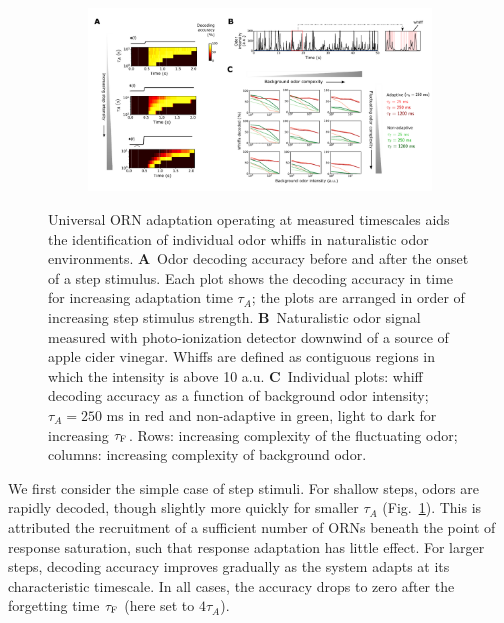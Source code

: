 \documentclass[9pt,twocolumn,twoside,lineno]{pnas-new}
\begin{document}
\begin{figure}[!tb]
	\begin{subfigure}[t]{\linewidth}
		{\includegraphics[width=\linewidth]{figures/4_temporal_coding}}
		\label{fig:temporal_coding_a}
	\end{subfigure}
	\begin{subfigure}[t]{0\linewidth}
		\label{fig:temporal_coding_b}
	\end{subfigure}
	\begin{subfigure}[t]{0\linewidth}
		\label{fig:temporal_coding_c}
	\end{subfigure}
	\caption{\footnotesize{Universal ORN adaptation operating at measured timescales aids the identification of individual odor whiffs in naturalistic odor environments.
			\textbf{A}~Odor decoding accuracy before and after the onset of a step stimulus. Each plot shows the decoding accuracy in time for increasing adaptation time $\tau_A$; the plots are arranged in order of increasing step stimulus strength. 
			\textbf{B}~Naturalistic odor signal measured with photo-ionization detector downwind of a source of apple cider vinegar. Whiffs are defined as contiguous regions in which the intensity is above 10 a.u.
			\textbf{C}~Individual plots: whiff decoding accuracy as a function of background odor intensity; $\tau_A = 250$ ms in red and non-adaptive in green, light to dark for increasing $\tau_{\textup{F}}$. Rows: increasing complexity of the fluctuating odor; columns: increasing complexity of background odor. }}
	\label{fig:temporal_coding}
\end{figure}

We first consider the simple case of step stimuli. For shallow steps, odors are rapidly decoded, though slightly more quickly for smaller $\tau_A$ (Fig.~\ref{fig:temporal_coding_a}). This is attributed the recruitment of a sufficient number of ORNs beneath the point of response saturation, such that response adaptation has little effect. For larger steps, decoding accuracy improves gradually as the system adapts at its characteristic timescale. In all cases, the accuracy drops to zero after the forgetting time $\tau_{\textup{F}}$ (here set to $4\tau_A$). 
\end{document}

